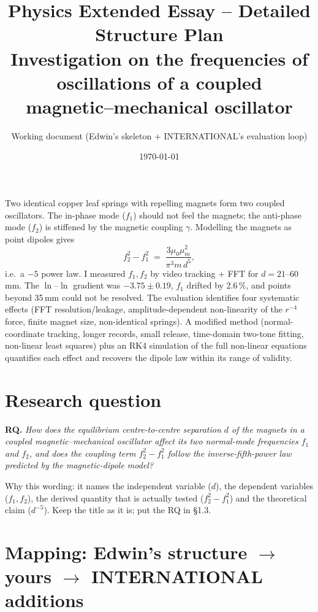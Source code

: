 \documentclass[11pt,a4paper]{article}
\title{\textbf{Physics Extended Essay -- Detailed Structure Plan}\\[4pt]
\large Investigation on the frequencies of oscillations of a coupled\\ magnetic--mechanical oscillator}
\author{Working document (Edwin's skeleton $+$ INTERNATIONAL's evaluation loop)}
\date{\today}
\newcommand{\muz}{\mu_0}
\newcommand{\mum}{\mu_m}
\begin{document}
\maketitle

\begin{storybox}
Two identical copper leaf springs with repelling magnets form two coupled oscillators.
The in-phase mode ($f_1$) should not feel the magnets; the anti-phase mode ($f_2$) is
stiffened by the magnetic coupling $\gamma$. Modelling the magnets as point dipoles gives
\[
  f_2^2 - f_1^2 \;=\; \frac{3\muz\mum^2}{\pi^3 m\, d^5},
\]
i.e.\ a $-5$ power law. I measured $f_1,f_2$ by video tracking $+$ FFT for
$d = 21$--$60\,$mm. The $\ln$--$\ln$ gradient was $-3.75\pm0.19$, $f_1$ drifted by
2.6\,\%, and points beyond 35\,mm could not be resolved. The evaluation identifies four
systematic effects (FFT resolution/leakage, amplitude-dependent non-linearity of the
$r^{-4}$ force, finite magnet size, non-identical springs). A modified method
(normal-coordinate tracking, longer records, small release, time-domain two-tone
fitting, non-linear least squares) plus an RK4 simulation of the full non-linear
equations quantifies each effect and recovers the dipole law within its range of validity.
\end{storybox}

\tableofcontents
\bigskip

\section{Research question}

\textbf{RQ.} \emph{How does the equilibrium centre-to-centre separation $d$ of the magnets
in a coupled magnetic--mechanical oscillator affect its two normal-mode frequencies $f_1$
and $f_2$, and does the coupling term $f_2^2 - f_1^2$ follow the inverse-fifth-power law
predicted by the magnetic-dipole model?}

Why this wording: it names the independent variable ($d$), the dependent variables
($f_1,f_2$), the derived quantity that is actually tested ($f_2^2-f_1^2$) and the
theoretical claim ($d^{-5}$). Keep the title as it is; put the RQ in \S1.3.

\section{Mapping: Edwin's structure $\rightarrow$ yours $\rightarrow$ INTERNATIONAL additions}
\end{document}
